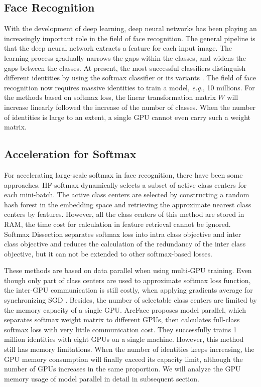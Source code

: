 \documentclass[letterpaper]{article} \usepackage{style/aaai21}  \usepackage{times}  \usepackage{helvet} \usepackage{courier}  \usepackage[hyphens]{url}  \usepackage{graphicx} \usepackage{color}
\begin{document}
\subsection{Face Recognition}
With the development of deep learning, deep neural networks has been playing an increasingly important role in the field of face recognition. The general pipeline is that the deep neural network extracts a feature for each input image. The learning process gradually narrows the gaps within the classes, and widens the gaps between the classes. At present, the most successful classifiers distinguish different identities by using the softmax classifier or its variants \cite{wang2018cosface,deng2019arcface,liu2017sphereface}. The field of face recognition now requires massive identities to train a model, \emph{e.g.}, 10 millions. For the methods based on softmax loss, the linear transformation matrix $W$ will increase linearly followed the increase of the number of classes. When the number of identities is large to an extent, a single GPU cannot even carry such a weight matrix.  

    \subsection{Acceleration for Softmax} For accelerating large-scale softmax in face recognition, there have been some approaches. HF-softmax \cite{goodman2001classes} dynamically selects a subset of active class centers for each mini-batch. The active class centers are selected by constructing a random hash forest in the embedding space and retrieving the approximate nearest class centers by features. However, all the class centers of this method are stored in RAM, the time cost for calculation in feature retrieval cannot be ignored. Softmax Dissection \cite{he2020softmax}  separates softmax loss into intra class objective and inter class objective and reduces the calculation of the redundancy of the inter class objective, but it can not be extended to other softmax-based losses. 

These methods are based on data parallel when using multi-GPU training. Even though only part of class centers are used to approximate softmax loss function, the inter-GPU communication is still costly, when applying gradients average for synchronizing SGD \cite{li2014scaling}. Besides, the number of selectable class centers are limited by the memory capacity of a single GPU. ArcFace \cite{deng2019arcface} proposes model parallel, which separates softmax weight matrix to different GPUs, then calculates full-class softmax loss with very little communication cost. They successfully trains 1 million identities with eight GPUs on a single machine. However, this method still has memory limitations. When the number of identities keeps increasing, the GPU memory consumption 
will finally exceed its capacity limit, although the number of GPUs increases in the same proportion. We will analyze the GPU memory usage of model parallel in detail in subsequent section. 
\end{document}
